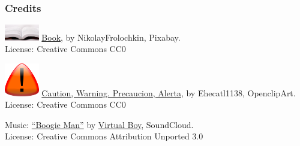 \documentclass[17pt,aspectratio=169,hyperref={pdfusetitle,colorlinks,allcolors=olive}]{beamer}
\begin{document}
\begin{frame}[fragile]
  \frametitle{Credits}

  \includegraphics[width=1.5cm]{figs/bookpages}
  {\small \href{https://pixabay.com/en/book-reading-library-literature-1261800/}{Book}, by NikolayFrolochkin, Pixabay. \\ License: Creative Commons CC0 \\}

  \includegraphics[width=1.5cm]{figs/signal-caution}
  {\small \href{https://openclipart.org/detail/118033/caution-warning-precaucion-alerta}{Caution, Warning. Precaucion, Alerta}, by Ehecatl1138, OpenclipArt.\\ License: Creative Commons CC0\\}

  \vspace{.3cm}

  {\small Music: \href{https://soundcloud.com/virtualboymusic/boogie-man}{``Boogie Man''} by \href{https://soundcloud.com/virtualboymusic}{Virtual Boy}, SoundCloud. \\ License: Creative Commons Attribution Unported 3.0 \\}
 

\end{frame}




\end{document}
